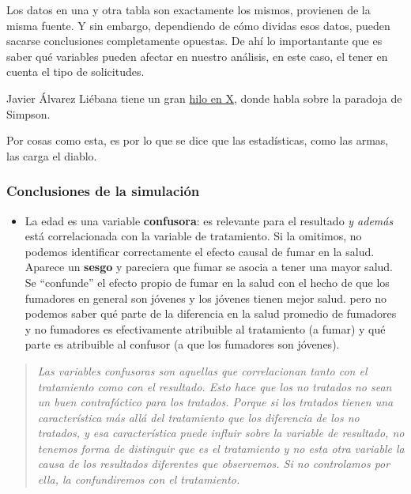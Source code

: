 \documentclass[
  a4paper,
  DIV=11,
  numbers=noendperiod]{scrreprt}
\providecommand{\tightlist}{%
  \setlength{\itemsep}{0pt}\setlength{\parskip}{0pt}}\usepackage{longtable,booktabs,array}
\begin{document}
Los datos en una y otra tabla son exactamente los mismos, provienen de
la misma fuente. Y sin embargo, dependiendo de cómo dividas esos datos,
pueden sacarse conclusiones completamente opuestas. De ahí lo
importantante que es saber qué variables pueden afectar en nuestro
análisis, en este caso, el tener en cuenta el tipo de solicitudes.

Javier Álvarez Liébana tiene un gran
\href{https://x.com/DadosdeLaplace/status/1420295550436532225}{hilo en
X}, donde habla sobre la paradoja de Simpson.

Por cosas como esta, es por lo que se dice que las estadísticas, como
las armas, las carga el diablo.

\subsubsection{Conclusiones de la
simulación}\label{conclusiones-de-la-simulaciuxf3n}

\begin{itemize}
\tightlist
\item
  La edad es una variable \textbf{confusora}: es relevante para el
  resultado \emph{y además} está correlacionada con la variable de
  tratamiento. Si la omitimos, no podemos identificar correctamente el
  efecto causal de fumar en la salud. Aparece un \textbf{sesgo} y
  pareciera que fumar se asocia a tener una mayor salud. Se ``confunde''
  el efecto propio de fumar en la salud con el hecho de que los
  fumadores en general son jóvenes y los jóvenes tienen mejor salud.
  pero no podemos saber qué parte de la diferencia en la salud promedio
  de fumadores y no fumadores es efectivamente atribuible al tratamiento
  (a fumar) y qué parte es atribuible al confusor (a que los fumadores
  son jóvenes).
\end{itemize}

\begin{quote}
\emph{Las variables confusoras son aquellas que correlacionan tanto con
el tratamiento como con el resultado. Esto hace que los no tratados no
sean un buen contrafáctico para los tratados. Porque si los tratados
tienen una característica más allá del tratamiento que los diferencia de
los no tratados, y esa característica puede influir sobre la variable de
resultado, no tenemos forma de distinguir que es el tratamiento y no
esta otra variable la causa de los resultados diferentes que observemos.
Si no controlamos por ella, la confundiremos con el tratamiento.}
\end{quote}
\end{document}
